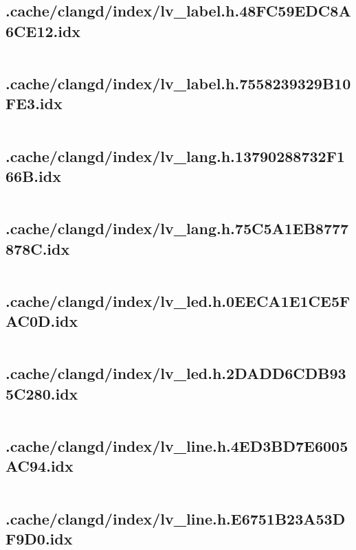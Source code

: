 \subsection{.cache/clangd/index/lv_label.h.48FC59EDC8A6CE12.idx}
\inputminted[linenos,tabsize=2,breaklines, breakanywhere]{c}{lv_label.h.48FC59EDC8A6CE12.idx}
\pagebreak

\subsection{.cache/clangd/index/lv_label.h.7558239329B10FE3.idx}
\inputminted[linenos,tabsize=2,breaklines, breakanywhere]{c}{lv_label.h.7558239329B10FE3.idx}
\pagebreak

\subsection{.cache/clangd/index/lv_lang.h.13790288732F166B.idx}
\inputminted[linenos,tabsize=2,breaklines, breakanywhere]{c}{lv_lang.h.13790288732F166B.idx}
\pagebreak

\subsection{.cache/clangd/index/lv_lang.h.75C5A1EB8777878C.idx}
\inputminted[linenos,tabsize=2,breaklines, breakanywhere]{c}{lv_lang.h.75C5A1EB8777878C.idx}
\pagebreak

\subsection{.cache/clangd/index/lv_led.h.0EECA1E1CE5FAC0D.idx}
\inputminted[linenos,tabsize=2,breaklines, breakanywhere]{c}{lv_led.h.0EECA1E1CE5FAC0D.idx}
\pagebreak

\subsection{.cache/clangd/index/lv_led.h.2DADD6CDB935C280.idx}
\inputminted[linenos,tabsize=2,breaklines, breakanywhere]{c}{lv_led.h.2DADD6CDB935C280.idx}
\pagebreak

\subsection{.cache/clangd/index/lv_line.h.4ED3BD7E6005AC94.idx}
\inputminted[linenos,tabsize=2,breaklines, breakanywhere]{c}{lv_line.h.4ED3BD7E6005AC94.idx}
\pagebreak

\subsection{.cache/clangd/index/lv_line.h.E6751B23A53DF9D0.idx}
\inputminted[linenos,tabsize=2,breaklines, breakanywhere]{c}{lv_line.h.E6751B23A53DF9D0.idx}
\pagebreak

